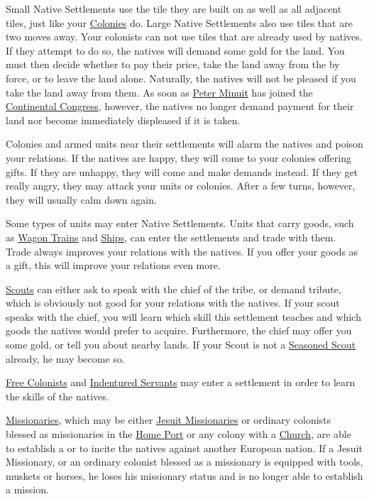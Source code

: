 \documentclass[12pt]{book}
\begin{document}
Small Native Settlements use the tile they are built on as well as all
adjacent tiles, just like your \hyperlink{Colonies}{Colonies}
do. Large Native Settlements also use tiles that are two moves
away. Your colonists can not use tiles that are already used by
natives. If they attempt to do so, the natives will demand some gold
for the land. You must then decide whether to pay their price, take
the land away from the by force, or to leave the land alone.
Naturally, the natives will not be pleased if you take the land away
from them. As soon as \hyperlink{Peter Minuit}{Peter Minuit} has
joined the \hyperlink{Continental Congress}{Continental Congress},
however, the natives no longer demand payment for their land nor
become immediately displeased if it is taken.

Colonies and armed units near their settlements will alarm the natives
and poison your relations. If the natives are happy, they will come to
your colonies offering gifts. If they are unhappy, they will come and
make demands instead. If they get really angry, they may attack your
units or colonies. After a few turns, however, they will usually calm
down again.

Some types of units may enter Native Settlements. Units that carry
goods, such as \hyperlink{Wagon Train}{Wagon Trains} and
\hyperlink{Naval Units}{Ships}, can enter the settlements and trade
with them. Trade always improves your relations with the natives. If
you offer your goods as a gift, this will improve your relations even
more.

\hyperlink{Scout}{Scouts} can either ask to speak with the chief of
the tribe, or demand tribute, which is obviously not good for your
relations with the natives. If your scout speaks with the chief, you
will learn which skill this settlement teaches and which goods the
natives would prefer to acquire. Furthermore, the chief may offer you
some gold, or tell you about nearby lands. If your Scout is not a
\hyperlink{Seasoned Scout}{Seasoned Scout} already, he may become so.

\hyperlink{Free Colonist}{Free Colonists} and \hyperlink{Indentured 
Servant}{Indentured Servants} may enter a settlement in order to learn
the skills of the natives. 

\hyperlink{Missionary}{Missionaries}, which may be either
\hyperlink{Jesuit Missionary}{Jesuit Missionaries} or ordinary
colonists blessed as missionaries in the \hyperlink{Home Port}{Home
  Port} or any colony with a \hyperlink{Church}{Church}, are able to
establish a  or to incite the natives against another
European nation. If a Jesuit Missionary, or an ordinary colonist
blessed as a missionary is equipped with tools, muskets or horses, he
loses his missionary status and is no longer able to establish a
mission.
\end{document}
